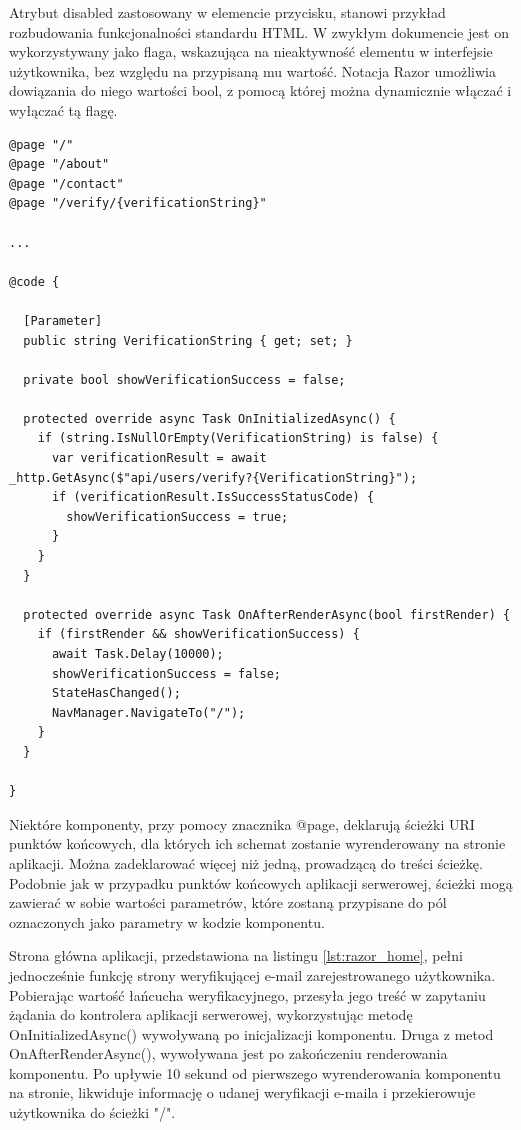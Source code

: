 Atrybut disabled zastosowany w elemencie przycisku, stanowi przykład rozbudowania funkcjonalności standardu HTML. W zwykłym dokumencie jest on wykorzystywany jako flaga, wskazująca na nieaktywność elementu w interfejsie użytkownika, bez względu na przypisaną mu wartość. Notacja Razor umożliwia dowiązania do niego wartości bool, z pomocą której można dynamicznie włączać i wyłączać tą flagę.

\begin{lstlisting}[language=CSharp, caption={Komponent Razor tworzący odnośniki do swojej zawartości, przy pomocy znaczników page}, label=lst:razor_home]
@page "/"
@page "/about"
@page "/contact"
@page "/verify/{verificationString}"

...

@code {

  [Parameter]
  public string VerificationString { get; set; }

  private bool showVerificationSuccess = false;

  protected override async Task OnInitializedAsync() {
    if (string.IsNullOrEmpty(VerificationString) is false) {
      var verificationResult = await _http.GetAsync($"api/users/verify?{VerificationString}");
      if (verificationResult.IsSuccessStatusCode) {
        showVerificationSuccess = true;
      }
    }
  }

  protected override async Task OnAfterRenderAsync(bool firstRender) {
    if (firstRender && showVerificationSuccess) {
      await Task.Delay(10000);
      showVerificationSuccess = false;
      StateHasChanged();
      NavManager.NavigateTo("/");
    }
  }

}
\end{lstlisting}

Niektóre komponenty, przy pomocy znacznika @page, deklarują ścieżki URI punktów końcowych, dla których ich schemat zostanie wyrenderowany na stronie aplikacji. Można zadeklarować więcej niż jedną, prowadzącą do treści ścieżkę. Podobnie jak w przypadku punktów końcowych aplikacji serwerowej, ścieżki mogą zawierać w sobie wartości parametrów, które zostaną przypisane do pól oznaczonych jako parametry w kodzie komponentu.

Strona główna aplikacji, przedstawiona na listingu \ref{lst:razor_home}, pełni jednocześnie funkcję strony weryfikującej e-mail zarejestrowanego użytkownika. Pobierając wartość łańcucha weryfikacyjnego, przesyła jego treść w zapytaniu żądania do kontrolera aplikacji serwerowej, wykorzystując metodę OnInitializedAsync() wywoływaną po inicjalizacji komponentu. Druga z metod OnAfterRenderAsync(), wywoływana jest po zakończeniu renderowania komponentu. Po upływie 10 sekund od pierwszego wyrenderowania komponentu na stronie, likwiduje informację o udanej weryfikacji e-maila i przekierowuje użytkownika do ścieżki "/".

